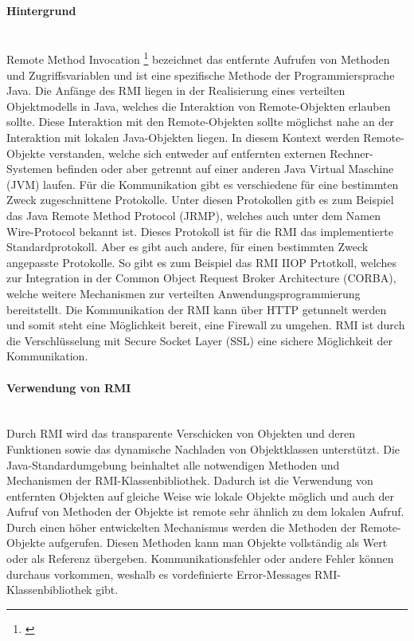 \paragraph{Hintergrund} \mbox{} \vspace{2mm} \\ 
Remote Method Invocation \footnote{\cite{rmi}} bezeichnet das entfernte Aufrufen von Methoden und Zugriffsvariablen und ist eine spezifische Methode der Programmiersprache Java. Die Anfänge des RMI liegen in der Realisierung eines verteilten Objektmodells in Java, welches die Interaktion von Remote-Objekten erlauben sollte. Diese Interaktion mit den Remote-Objekten sollte möglichst nahe an der Interaktion mit lokalen Java-Objekten liegen. In diesem Kontext werden Remote-Objekte verstanden, welche sich entweder auf entfernten externen Rechner-Systemen befinden oder aber getrennt auf einer anderen Java Virtual Maschine (JVM) laufen. Für die Kommunikation gibt es verschiedene für eine bestimmten Zweck zugeschnittene Protokolle. Unter diesen Protokollen gitb es zum Beispiel das Java Remote Method Protocol (JRMP), welches auch unter dem Namen Wire-Protocol bekannt ist. Dieses Protokoll ist für die RMI das implementierte Standardprotokoll. Aber es gibt auch andere, für einen bestimmten Zweck angepasste Protokolle. So gibt es zum Beispiel das RMI IIOP Prtotkoll, welches zur Integration in der Common Object Request Broker Architecture (CORBA), welche weitere Mechanismen zur verteilten Anwendungsprogrammierung bereitstellt. Die Kommunikation der RMI kann über HTTP getunnelt werden und somit steht eine Möglichkeit bereit, eine Firewall zu umgehen. RMI ist durch die Verschlüsselung mit Secure Socket Layer (SSL) eine sichere Möglichkeit der Kommunikation.

\paragraph{Verwendung von RMI} \mbox{} \vspace{2mm} \\ 
Durch RMI wird das transparente Verschicken von Objekten und deren Funktionen sowie das dynamische Nachladen von Objektklassen unterstützt. Die Java-Standardumgebung beinhaltet alle notwendigen Methoden und Mechanismen der RMI-Klassenbibliothek. Dadurch ist die Verwendung von entfernten Objekten auf gleiche Weise wie lokale Objekte möglich und auch der Aufruf von Methoden der Objekte ist remote sehr ähnlich zu dem lokalen Aufruf. Durch einen höher entwickelten Mechanismus werden die Methoden der Remote-Objekte aufgerufen. Diesen Methoden kann man Objekte vollständig als Wert oder als Referenz übergeben. Kommunikationsfehler oder andere Fehler können durchaus vorkommen, weshalb es vordefinierte Error-Messages RMI-Klassenbibliothek gibt.

